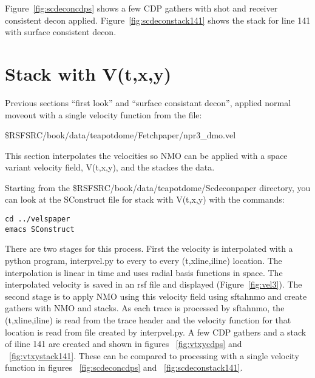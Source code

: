 Figure~\ref{fig:scdeconcdps} shows a few CDP gathers with shot and receiver consistent decon applied.  Figure~\ref{fig:scdeconstack141} shows the stack for line 141 with surface consistent decon.



\section{Stack with V(t,x,y)}

Previous sections ``first look'' and  ``surface consistant decon'', applied normal moveout  with a single velocity function from the file:

\$RSFSRC/book/data/teapotdome/Fetchpaper/npr3\_dmo.vel

This section interpolates the velocities so NMO can be applied with a space variant velocity field, V(t,x,y), and the stackes the data.

Starting from the \$RSFSRC/book/data/teapotdome/Scdeconpaper directory, you can look at the SConstruct file for stack with V(t,x,y) with the commands:
\begin{verbatim}  
cd ../velspaper
emacs SConstruct
\end{verbatim}  

There are two stages for this process.  First the velocity is interpolated with a python program, interpvel.py to every to every (t,xline,iline) location.  The interpolation is linear in time and uses radial basis functions in space.  The interpolated velocity is saved in an rsf file and displayed (Figure~\ref{fig:vel3}). The second stage is to apply NMO using this velocity field using sftahnmo and create gathers with NMO and stacks.  As each trace is processed by sftahnmo, the (t,xline,iline) is read from the trace header and the velocity function for that location is read from file created by interpvel.py.  A few CDP gathers and a stack of iline 141 are created and shown in figures ~\ref{fig:vtxycdps} and ~\ref{fig:vtxystack141}.  These can be compared to processing with a single velocity function in figures ~\ref{fig:scdeconcdps} and ~\ref{fig:scdeconstack141}.


